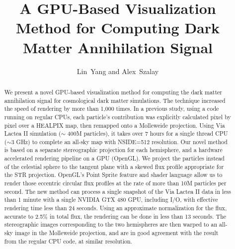 
\resetcounters




\title{A GPU-Based Visualization Method for Computing Dark Matter Annihilation Signal}
\author{Lin~Yang and Alex~Szalay
}


\begin{abstract}
We present a novel GPU-based visualization method for computing the dark matter annihilation signal for cosmological dark matter simulations. The technique increased the speed of rendering by more than 1,000 times. In a previous study, using a code running on regular CPUs, each particle's contribution was explicitly calculated pixel by pixel over a HEALPIX map, then remapped onto a Molleweide projection. Using Via Lactea II simulation ($\sim$ 400M particles), it takes over 7 hours for a single thread CPU ($\sim$3 GHz) to complete an all-sky map with  NSIDE=512 resolution. Our novel method is based on a separate stereographic projection for each hemisphere, and a hardware accelerated rendering pipeline on a GPU (OpenGL). We project the particles instead of the celestial sphere to the tangent plane with a skewed flux profile appropriate for the STR projection. OpenGL's Point Sprite feature and shader language allow us to render those eccentric circular flux profiles at the rate of more than 10M particles per second. The new method can process a single snapshot of the Via Lactea II data in less than 1 minute with a single NVIDIA GTX 480 GPU, including I/O, with effective rendering time less than 24 seconds. Using an approximate normalization for the flux, accurate to 2.5\% in total flux, the rendering can be done in less than 13 seconds. The stereographic images corresponding to the two hemispheres are then warped to an all-sky image in the Molleweide projection, and are in good agreement with the result from the regular CPU code, at similar resolution.

\end{abstract}

